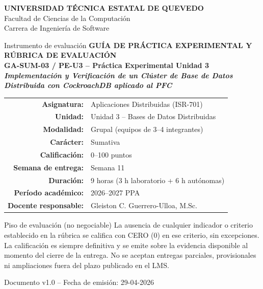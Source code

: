 \documentclass[11pt,a4paper]{article}
\begin{document}
\begin{titlepage}
    \centering
    \vspace*{0.5cm}
    {\Large\bfseries\color{uteqBlue}
        UNIVERSIDAD T\'ECNICA ESTATAL DE QUEVEDO
    }\\[0.2cm]
    {\large\color{uteqBlue}
        Facultad de Ciencias de la Computaci\'on
    }\\[0.1cm]
    {\normalsize Carrera de Ingenier\'ia de Software}\\[1.2cm]

    \begin{uteqbox}[width=\linewidth]{Instrumento de evaluaci\'on}
        \centering
        \Large\bfseries GU\'IA DE PR\'ACTICA EXPERIMENTAL Y R\'UBRICA DE EVALUACI\'ON\\[0.3cm]
        \normalsize
        \textbf{GA-SUM-03 / PE-U3 -- Pr\'actica Experimental Unidad 3}\\
        \textit{Implementaci\'on y Verificaci\'on de un Cl\'uster de Base de Datos Distribuida con CockroachDB aplicado al PFC}
    \end{uteqbox}

    \vspace{0.8cm}
    \begin{tabular}{rl}
        \textbf{Asignatura:} & Aplicaciones Distribuidas (ISR-701)\\
        \textbf{Unidad:} & Unidad 3 -- Bases de Datos Distribuidas\\
        \textbf{Modalidad:} & Grupal (equipos de 3--4 integrantes)\\
        \textbf{Car\'acter:} & Sumativa\\
        \textbf{Calificaci\'on:} & 0--100 puntos\\
        \textbf{Semana de entrega:} & Semana 11\\
        \textbf{Duraci\'on:} & 9 horas (3 h laboratorio + 6 h aut\'onomas)\\
        \textbf{Per\'iodo acad\'emico:} & 2026--2027 PPA\\
        \textbf{Docente responsable:} & Gleiston C. Guerrero-Ulloa, M.Sc.\\
    \end{tabular}

    \vspace{1.0cm}
    \begin{uteqwarn}[width=\linewidth]{Piso de evaluaci\'on (no negociable)}
        \small\justifying
        La ausencia de cualquier indicador o criterio establecido en la r\'ubrica se califica con CERO (0) en ese criterio, sin excepciones. La calificaci\'on es siempre definitiva y se emite sobre la evidencia disponible al momento del cierre de la entrega. No se aceptan entregas parciales, provisionales ni ampliaciones fuera del plazo publicado en el LMS.
    \end{uteqwarn}

    \vfill
    {\small Documento v1.0 -- Fecha de emisi\'on: 29-04-2026}
\end{titlepage}
\end{document}
